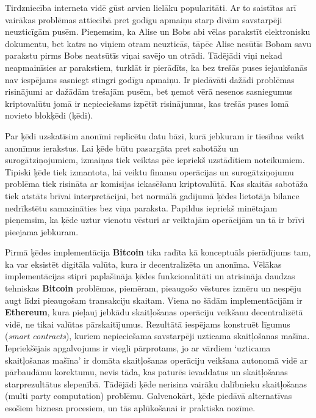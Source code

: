 Tirdzniecība interneta vidē gūst arvien lielāku popularitāti. 
Ar to saistītas arī vairākas problēmas attiecībā pret godīgu apmaiņu starp divām savstarpēji neuzticīgām pusēm. 
Pieņemsim, ka Alise un Bobs abi vēlas parakstīt elektronisku dokumentu, bet katrs no viņiem otram neuzticās, tāpēc Alise nesūtīs Bobam savu parakstu pirms Bobs neatsūtīs viņai savējo un otrādi. 
Tādējādi viņi nekad neapmainīsies ar parakstiem, turklāt ir pierādīts, ka bez trešās puses iejaukšanās nav iespējams sasniegt stingri godīgu apmaiņu.\cite{pagnia99}
Ir piedāvāti dažādi problēmas risinājumi ar dažādām trešajām pusēm, bet ņemot vērā nesenos sasniegumus kriptovalūtu jomā ir nepieciešams izpētīt risinājumus, kas trešās puses lomā novieto blokķēdi (ķēdi). 

Par ķēdi uzskatīsim anonīmi replicētu datu bāzi, kurā jebkuram ir tiesības veikt anonīmus ierakstus. Lai ķēde būtu pasargāta pret sabotāžu un surogātziņojumiem, izmaiņas tiek veiktas pēc iepriekš uzstādītiem noteikumiem.
Tipiski ķēde tiek izmantota, lai veiktu finansu operācijas un surogātziņojumu problēma tiek risināta ar komisijas iekasēšanu kriptovalūtā. Kas skaitās sabotāža tiek atstāts brīvai interpretācijai, bet normālā gadījumā ķēdes lietotāja bilance nedrīkstētu samazināties bez viņa paraksta. Papildus iepriekš minētajam pieņemsim, ka ķēde uztur vienotu vēsturi ar veiktajām operācijām un tā ir brīvi pieejama jebkuram.

Pirmā ķēdes implementācija \textbf{Bitcoin} tika radīta kā konceptuāls pierādījums tam, ka var eksistēt digitāla valūta, kura ir decentralizēta un anonīma. 
Vēlākas implementācijas stipri paplašināja ķēdes funkcionalitāti un atrisināja daudzas tehniskas \textbf{Bitcoin} problēmas, piemēram, pieaugošo vēstures izmēru un nespēju augt līdzi pieaugošam transakciju skaitam.\cite{barber12}
Viena no šādām implementācijām ir \textbf{Ethereum}, kura pieļauj jebkādu skaitļošanas operāciju veikšanu decentralizētā vidē, ne tikai valūtas pārskaitījumus.\cite{etherum}
Rezultātā iespējams konstruēt līgumus (\textit{smart contracts}), kuriem nepieciešama savstarpēji uzticama skaitļošanas mašīna.
Iepriekšējais apgalvojums ir viegli pārprotams, jo ar vārdiem `uzticama skaitļošanas mašīna' ir domāta skaitļošanas operāciju veikšana autonomā vidē ar pārbaudāmu korektumu, nevis tāda, kas paturēs ievaddatus un skaitļošanas starprezultātus slepenībā.
Tādējādi ķēde nerisina vairāku dalībnieku skaitļošanas (multi party computation) problēmu.
Galvenokārt, ķēde piedāvā alternatīvas esošiem biznesa procesiem, un tās aplūkošanai ir praktiska nozīme.

